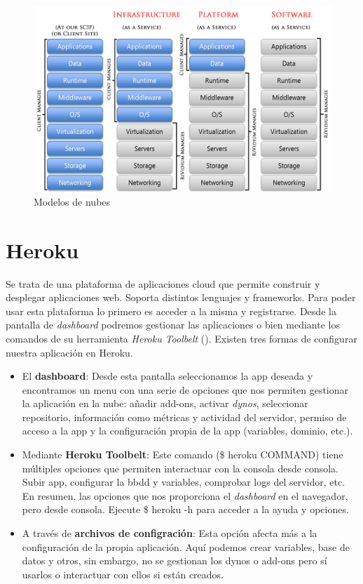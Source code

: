 \begin{figure}[H]
	\centering
	\includegraphics[width=12cm]{./images/cloud-models.png}
	\caption{Modelos de nubes} \label{fig:cloud-models}
\end{figure}

\vspace*{0.2in}
\section{Heroku}\label{cap.3.2}

Se trata de una plataforma de aplicaciones cloud que permite construir y desplegar aplicaciones web. Soporta distintos lenguajes y frameworks. Para poder usar esta plataforma lo primero es acceder a la misma y registrarse. Desde la pantalla de \emph{dashboard} podremos gestionar las aplicaciones o bien mediante los comandos de su herramienta \emph{Heroku Toolbelt} (\cite{URL:HerokuToolbelt}). Existen tres formas de configurar nuestra aplicación en Heroku.
\begin{itemize}
	\item El \textbf{dashboard}: Desde esta pantalla seleccionamos la app deseada y encontramos un menu con una serie de opciones que nos permiten gestionar la aplicación en la nube: añadir add-ons, activar \emph{dynos}, seleccionar repositorio, información como métricas y actividad del servidor, permiso de acceso a la app y la configuración propia de la app (variables, dominio, etc.).
	\item Mediante \textbf{Heroku Toolbelt}: Este comando (\$ heroku COMMAND) tiene múltiples opciones que permiten interactuar con la consola desde consola. Subir app, configurar la bbdd y variables, comprobar logs del servidor, etc. En resumen, las opciones que nos proporciona el \emph{dashboard} en el navegador, pero desde consola. Ejecute \$ heroku -h para acceder a la ayuda y opciones.
	\item A través de \textbf{archivos de configración}: Esta opción afecta más a la configuración de la propia aplicación. Aquí podemos crear variables, base de datos y otros, sin embargo, no se gestionan los dynos o add-ons pero sí usarlos o interactuar con ellos si están creados.
\end{itemize}

